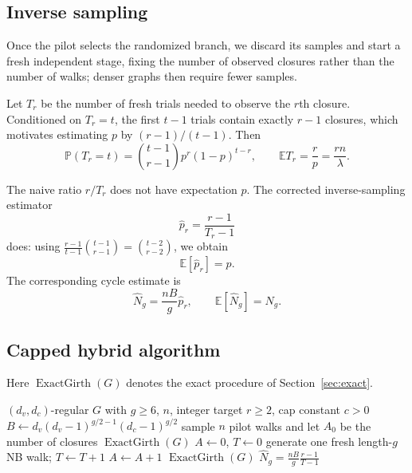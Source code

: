 \documentclass[conference]{IEEEtran}
\newcommand{\E}{\mathbb{E}}
\newcommand{\Prb}{\mathbb{P}}
\begin{document}
\subsection{Inverse sampling}
Once the pilot selects the randomized branch, we discard its samples and
start a fresh independent stage, fixing the number of observed closures
rather than the number of walks; denser graphs then require fewer samples.

Let $T_r$ be the number of fresh
trials needed to observe the $r$th closure. 
Conditioned on $T_r=t$, the first $t-1$ trials contain exactly $r-1$
closures, which motivates estimating $p$ by $(r-1)/(t-1)$. Then
\begin{equation}\label{eq:negative-binomial}
 \Prb(T_r=t)=\binom{t-1}{r-1}p^r(1-p)^{t-r},
 \qquad
 \E T_r=\frac{r}{p}=\frac{rn}{\lambda}.
\end{equation}

The naive ratio $r/T_r$ does not have expectation $p$.  The corrected
inverse-sampling estimator~\cite{mendo2009}
\[
\widehat p_r=\frac{r-1}{T_r-1}
\]
does: using $\frac{r-1}{t-1}\binom{t-1}{r-1}
=
\binom{t-2}{r-2}$,
we obtain
\[
\E[\widehat p_r]=p.
\]
The corresponding cycle estimate is
\begin{equation}\label{eq:inverse-est}
 \widehat N_g=\frac{nB}{g}\widehat p_r,
 \qquad \E[\widehat N_g]=N_g.
\end{equation}

\subsection{Capped hybrid algorithm}

Here $\operatorname{ExactGirth}(G)$ denotes the exact procedure of
Section~\ref{sec:exact}.

\begin{algorithm}[t]
\caption{Hybrid sequential girth-cycle counter}\label{alg:hybrid}
\footnotesize
\begin{algorithmic}[1]
\Require $(d_v,d_c)$-regular $G$ with $g\ge6$, $n$, integer target $r\ge2$, cap constant $c>0$
\State $B\gets d_v(d_v-1)^{g/2-1}(d_c-1)^{g/2}$
\State sample $n$ pilot walks and let $A_0$ be the number of closures
  \State \Return $\operatorname{ExactGirth}(G)$
\EndIf
\State $A\gets0$, $T\gets0$
  \State generate one fresh length-$g$ NB walk; $T\gets T+1$
    \State $A\gets A+1$
  \EndIf
\EndWhile
{}
  \State \Return $\operatorname{ExactGirth}(G)$
\EndIf
\State \Return $\displaystyle
\widehat N_g=\frac{nB}{g}\frac{r-1}{T-1}$
\end{algorithmic}
\end{algorithm}
\end{document}
